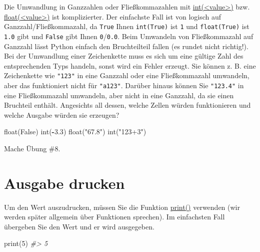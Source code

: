 \documentclass[
]{book}
\newenvironment{Shaded}{\begin{snugshade}}{\end{snugshade}}
\newcommand{\BuiltInTok}[1]{#1}
\newcommand{\CommentTok}[1]{\textcolor[rgb]{0.56,0.35,0.01}{\textit{#1}}}
\newcommand{\DecValTok}[1]{\textcolor[rgb]{0.00,0.00,0.81}{#1}}
\newcommand{\FloatTok}[1]{\textcolor[rgb]{0.00,0.00,0.81}{#1}}
\newcommand{\NormalTok}[1]{#1}
\newcommand{\OperatorTok}[1]{\textcolor[rgb]{0.81,0.36,0.00}{\textbf{#1}}}
\newcommand{\StringTok}[1]{\textcolor[rgb]{0.31,0.60,0.02}{#1}}
\newcommand{\VariableTok}[1]{\textcolor[rgb]{0.00,0.00,0.00}{#1}}
\begin{document}
Die Umwandlung in Ganzzahlen oder Fließkommazahlen mit \href{https://docs.python.org/3/library/functions.html\#int}{int(\textless value\textgreater)} bzw. \href{https://docs.python.org/3/library/functions.html\#float}{float(\textless value\textgreater)} ist komplizierter. Der einfachste Fall ist von logisch auf Ganzzahl/Fließkommazahl, da \texttt{True} Ihnen \texttt{int(True)} ist \texttt{1} und \texttt{float(True)} ist \texttt{1.0} gibt und \texttt{False} gibt Ihnen \texttt{0}/\texttt{0.0}. Beim Umwandeln von Fließkommazahl auf Ganzzahl lässt Python einfach den Bruchteilteil fallen (es rundet nicht richtig!). Bei der Umwandlung einer Zeichenkette muss es sich um eine gültige Zahl des entsprechenden Typs handeln, sonst wird ein Fehler erzeugt. Sie können z. B. eine Zeichenkette wie \texttt{"123"} in eine Ganzzahl oder eine Fließkommazahl umwandeln, aber das funktioniert nicht für \texttt{"a123"}. Darüber hinaus können Sie \texttt{"123.4"} in eine Fließkommazahl umwandeln, aber nicht in eine Ganzzahl, da sie einen Bruchteil enthält. Angesichts all dessen, welche Zellen würden funktionieren und welche Ausgabe würden sie erzeugen?

\begin{Shaded}
\begin{Highlighting}[]
\BuiltInTok{float}\NormalTok{(}\VariableTok{False}\NormalTok{)}
\BuiltInTok{int}\NormalTok{(}\OperatorTok{{-}}\FloatTok{3.3}\NormalTok{)}
\BuiltInTok{float}\NormalTok{(}\StringTok{"67.8"}\NormalTok{)}
\BuiltInTok{int}\NormalTok{(}\StringTok{"123+3"}\NormalTok{)}
\end{Highlighting}
\end{Shaded}

Mache Übung \#8.

\hypertarget{print}{%
\section{Ausgabe drucken}\label{print}}

Um den Wert auszudrucken, müssen Sie die Funktion \href{https://docs.python.org/3/library/functions.html\#print}{print()} verwenden (wir werden später allgemein über Funktionen sprechen). Im einfachsten Fall übergeben Sie den Wert und er wird ausgegeben.

\begin{Shaded}
\begin{Highlighting}[]
\BuiltInTok{print}\NormalTok{(}\DecValTok{5}\NormalTok{)}
\CommentTok{\#\textgreater{} 5}
\end{Highlighting}
\end{Shaded}
\end{document}
